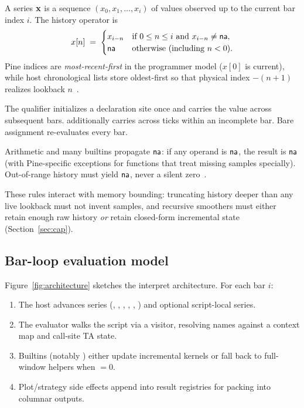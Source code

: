 \documentclass[11pt,a4paper]{article}
\begin{document}
\begin{definition}
A series $\mathbf{x}$ is a sequence $(x_0,x_1,\ldots,x_{i})$ of values observed
up to the current bar index $i$.  The history operator is
\begin{equation}
  x[n] \;=\;
  \begin{cases}
    x_{i-n} & \text{if } 0\le n\le i \text{ and } x_{i-n}\ne\textsf{na},\\
    \textsf{na}     & \text{otherwise (including } n<0\text{).}
  \end{cases}
\end{equation}
Pine indices are \emph{most-recent-first} in the programmer model ($x[0]$ is
current), while host chronological lists store oldest-first so that physical
index $-(n+1)$ realizes lookback $n$~\citep{tradingview-pine}.
\end{definition}

\begin{definition}
The qualifier  initializes a declaration site once and carries the
value across subsequent bars.   additionally carries across ticks
within an incomplete bar.  Bare assignment re-evaluates every bar.
\end{definition}

\begin{definition}[$\na$ propagation]
Arithmetic and many builtins propagate $\na$: if any operand is $\na$, the
result is $\na$ (with Pine-specific exceptions for functions that treat
missing samples specially).  Out-of-range history must yield $\na$, never a
silent zero~\citep{pynescript2026}.
\end{definition}

These rules interact with memory bounding: truncating history deeper than any
live lookback must not invent samples, and recursive smoothers must either
retain enough raw history \emph{or} retain closed-form incremental state
(Section~\ref{sec:cap}).

\subsection{Bar-loop evaluation model}
\label{sec:bg-barloop}

Figure~\ref{fig:architecture} sketches the interpret architecture.  For each
bar $i$:
\begin{enumerate}[leftmargin=*]
  \item The host advances \ohlcv{} series (, ,
        , , , ) and optional
        script-local series.
  \item The evaluator walks the script \ast{} via a visitor, resolving names
        against a context map and call-site TA state.
  \item Builtins (notably \ta{}) either update incremental kernels or fall
        back to full-window helpers when ${}=0$.
  \item Plot/strategy side effects append into result registries for packing
        into columnar outputs.
\end{enumerate}
\end{document}
